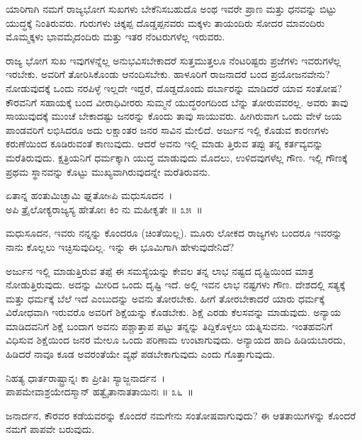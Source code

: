 \begin{artha}
ಯಾರಿಗಾಗಿ ನಮಗೆ ರಾಜ್ಯಭೋಗ ಸುಖಗಳು ಬೇಕೆನಿಸಬಹುದೊ ಅಂಥ ಇವರೇ ಪ್ರಾಣ ಮತ್ತು ಧನವನ್ನು ಬಿಟ್ಟು ಯುದ್ಧಕ್ಕೆ ನಿಂತಿರುವರು. ಗುರುಗಳು ಚಿಕ್ಕಪ್ಪ ದೊಡ್ಡಪ್ಪನವರು ಮಕ್ಕಳು ತಾಯಂದಿರು ಸೋದರ ಮಾವಂದಿರು ಮೊಮ್ಮಕ್ಕಳು ಭಾವಮೈದಂದಿರು ಮತ್ತು ಇತರ ನೆಂಟರುಗಳೆಲ್ಲ ಇರುವರು.
\end{artha}

ರಾಜ್ಯ ಭೋಗ ಸುಖ ಇವುಗಳನ್ನೆಲ್ಲ ಅನುಭವಿಸಬೇಕಾದರೆ ಸುತ್ತಮುತ್ತಲೂ ನೆಂಟರಿಷ್ಟರು ಪ್ರಜೆಗಳು ಇವರುಗಳೆಲ್ಲ ಇರಬೇಕು. ಅವರಿಗೆ ತೋರಿಸಿಕೊಂಡು ಆನಂದಿಸಬೇಕು. ಹಾಳೂರಿಗೆ ರಾಜನಾದರೆ ಬಂದ ಪ್ರಯೋಜನವೇನು? ನೋಡುವುದಕ್ಕೆ ಒಂದು ನರಪಿಳ್ಳೆ ಇಲ್ಲದೇ ಇದ್ದರೆ, ದೊಡ್ಡದೊಂದು ದರ್ಬಾರನ್ನು ಮಾಡಿದರೆ ಯಾವ ಸಂತೋಷ? ಕೌರವನಿಗೆ ಸಹಾಯಕ್ಕೆ ಬಂದ ವೀರಾಧಿವೀರರು ಸುಮ್ಮನೆ ಯುದ್ಧರಂಗದಿಂದ ಬೆನ್ನು ತೋರುವವರಲ್ಲ. ಅವರು ತಾವು ಸಾಯುವುದಕ್ಕೆ ಮುಂಚೆ ಬೇಕಾದಷ್ಟು ಜನರನ್ನು ಕೊಂದು ತಾವು ಸಾಯುವರು. ಹೀಗಿರುವಾಗ ಒಂದು ವೇಳೆ ಜಯ ಪಾಂಡವರಿಗೆ ಲಭಿಸಿದರೂ ಅದು ಲಕ್ಷಾಂತರ ಜನರ ಸಾವಿನ ಮೇಲಿದೆ. ಅರ್ಜುನ ಇಲ್ಲಿ ಕೊಡುವ ಕಾರಣಗಳು ಕರುಣೆಯಿಂದ ಕೂಡಿರುವಂತೆ ಕಾಣುವುದು. ಆದರೆ ಅವನು ಇಲ್ಲಿ ಮಾಡು ತ್ತಿರುವ ತಪ್ಪು ತನ್ನ ಕರ್ತವ್ಯವನ್ನು ಮರೆತಿರುವುದು. ಕ್ಷತ್ರಿಯನಿಗೆ ಧರ್ಮಕ್ಕಾಗಿ ಯುದ್ಧ ಮಾಡುವುದು ಮೊದಲು, ಉಳಿದವುಗಳೆಲ್ಲ ಗೌಣ. ಇಲ್ಲಿ ಗೌಣಕ್ಕೆ ಪ್ರಥಮ ಸ್ಥಾನವನ್ನು ಕೊಟ್ಟು ಮುಖ್ಯವಾಗಿರುವುದನ್ನೇ ಮರೆತಿರುವನು.

\begin{shloka}
ಏತಾನ್ನ ಹಂತುಮಿಚ್ಛಾಮಿ ಘ್ನತೋsಪಿ ಮಧುಸೂದನ~।\\ಅಪಿ ತ್ರೈಲೋಕ್ಯರಾಜ್ಯಸ್ಯ ಹೇತೋಃ ಕಿಂ ನು ಮಹೀಕೃತೇ \hfill॥ ೩೫~॥
\end{shloka}

\begin{artha}
ಮಧುಸೂದನ, ಇವರು ನನ್ನನ್ನು ಕೊಂದರೂ (ಚಿಂತೆಯಿಲ್ಲ). ಮೂರು ಲೋಕದ ರಾಜ್ಯಗಳು ಬಂದರೂ ಇವರನ್ನು ನಾನು ಕೊಲ್ಲಲು ಇಚ್ಛಿಸುವುದಿಲ್ಲ. ಇನ್ನು ಈ ಭೂಮಿಗಾಗಿ ಹೇಳುವುದೇನಿದೆ?
\end{artha}

ಅರ್ಜುನ ಇಲ್ಲಿ ಮಾಡುತ್ತಿರುವ ತಪ್ಪೆ ಈ ಸಮಸ್ಯೆಯನ್ನು ಕೇವಲ ತನ್ನ ಲಾಭ ನಷ್ಟದ ದೃಷ್ಟಿಯಿಂದ ಮಾತ್ರ ನೋಡುತ್ತಿರುವುದು. ಅದನ್ನು ಮೀರಿದ ಒಂದು ದೃಷ್ಟಿ ಇದೆ. ಅಲ್ಲಿ ಇವನ ಲಾಭ ನಷ್ಟಗಳು ಗೌಣ. ದೇಶದಲ್ಲಿ ಸತ್ಯಕ್ಕೆ ಮತ್ತು ಧರ್ಮಕ್ಕೆ ಬೆಲೆ ಇದೆ ಎಂಬುದನ್ನು ಅವನು ತೋರಬೇಕು. ಹೀಗೆ ತೋರಬೇಕಾದರೆ ಯಾರು ಧರ್ಮಕ್ಕೆ ವಿರೋಧವಾಗಿ ಇರುವರೊ ಅವರಿಗೆ ಶಿಕ್ಷೆಯನ್ನು ಕೊಡಬೇಕು. ಶಿಕ್ಷೆ ಎರಡು ಕೆಲಸವನ್ನು ಮಾಡುವುದು. ಅನ್ಯಾಯ ಮಾಡಿದವನಿಗೆ ಶಿಕ್ಷೆ ಬಂದಾಗ ಅವನು ಪಶ್ಚಾತ್ತಾಪ ಪಟ್ಟು ತನ್ನನ್ನು ತಿದ್ದಿಕೊಳ್ಳಲು ಯತ್ನಿಸುವನು. ಇಂತಹವನಿಗೆ ವಿಧಿಸುವ ಶಿಕ್ಷೆಯಿಂದ ಜನರ ಮೇಲೂ ಒಂದು ಪರಿಣಾಮ ಉಂಟಾಗುವುದು. ಅನ್ಯಾಯದ ಹಾದಿ ಹಿಡಿಯಬಾರದು, ಹಿಡಿದರೆ ನಾವೂ ಕೂಡ ಅವರಂತೆಯೇ ವ್ಯಥೆ ಪಡಬೇಕಾಗುವುದು ಎಂದು ಗೊತ್ತಾಗುವುದು.

\begin{shloka}
ನಿಹತ್ಯ ಧಾರ್ತರಾಷ್ಟ್ರಾನ್ನಃ ಕಾ ಪ್ರೀತಿಃ ಸ್ಯಾಜ್ಜನಾರ್ದನ~।\\ಪಾಪಮೇವಾಶ್ರಯೇದಸ್ಮಾನ್ ಹತ್ವೈತಾನಾತತಾಯಿನಃ \hfill॥ ೩೬~॥
\end{shloka}

\begin{artha}
ಜನಾರ್ದನ, ಕೌರವರ ಕಡೆಯವರನ್ನು ಕೊಂದರೆ ನಮಗೇನು ಸಂತೋಷವಾಗುವುದು? ಈ ಆತತಾಯಿಗಳನ್ನು ಕೊಂದರೆ ನಮಗೆ ಪಾಪವೇ ಬರುವುದು.
\end{artha}

